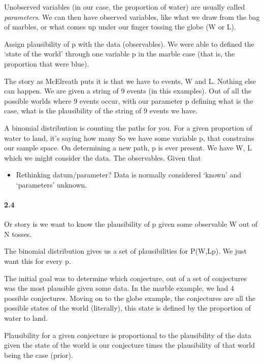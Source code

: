 \documentclass[11pt]{article}
\begin{document}
Unobserved variables (in our case, the proportion of water) are usually
called \emph{parameters}. We can then have observed variables, like what
we draw from the bag of marbles, or what comes up under our finger
tossing the globe (W or L).

Assign plausibility of p with the data (observables). We were able to
defined the `state of the world' through one variable p in the marble
case (that is, the proportion that were blue).

The story as McElreath puts it is that we have to events, W and L.
Nothing else can happen. We are given a string of 9 events (in this
examples). Out of all the possible worlds where 9 events occur, with our
parameter p defining what is the case, what is the plausibility of the
string of 9 events we have.

A binomial distribution is counting the paths for you. For a given
proportion of water to land, it's saying how many So we have some
variable p, that constrains our sample space. On determining a new path,
p is ever present. We have W, L which we might consider the data. The
observables. Given that

\begin{itemize}
\tightlist
\item
  Rethinking datum/parameter? Data is normally considered `known' and
  `parameters' unknown.
\end{itemize}

\hypertarget{section-2}{%
\paragraph{2.4}\label{section-2}}

Or story is we want to know the plausibility of p given some observable
W out of N tosses.

The binomial distribution gives us a set of plausibilities for
P(W,L\textbar{}p). We just want this for every p.

The initial goal was to determine which conjecture, out of a set of
conjectures was the most plausible given some data. In the marble
example, we had 4 possible conjectures. Moving on to the globe example,
the conjectures are all the possible states of the world (literally),
this state is defined by the proportion of water to land.

Plausibility for a given conjecture is proportional to the plausibility
of the data given the state of the world is our conjecture times the
plausibility of that world being the case (prior).
\end{document}
